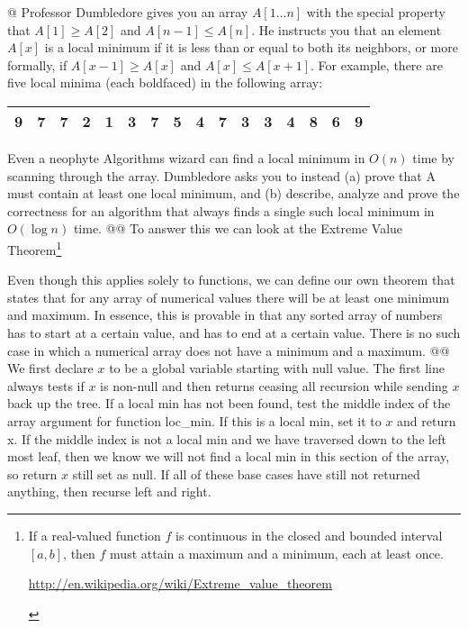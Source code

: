 \documentclass[10pt]{article}
\begin{document}
\begin{easylist}[enumerate]
    @ Professor Dumbledore gives you an array $A[1\ldots n]$ with the special property that $A[1] \ge A[2]$ and $A[n - 1]
    \le A[n]$. He instructs you that an element $A[x]$ is a local minimum if it is less than or equal to both its
    neighbors, or more formally, if $A[x − 1] \ge A[x]$ and $A[x] \le A[x + 1]$. For example, there are five local
    minima (each boldfaced) in the following array:

    \begin{table}[!ht]
        \centering
        \begin{tabular}{|l|l|l|l|l|l|l|l|l|l|l|l|l|l|l|l|}
            \hline
            9 & 7 & 7 & 2 & \textbf{1} & 3 & 7 & 5 & \textbf{4} & 7 & \textbf{3} & \textbf{3} & 4 & 8 & \textbf{6} & 9\\
            \hline
        \end{tabular}
    \end{table}

    Even a neophyte Algorithms wizard can find a local minimum in $O(n)$ time by scanning through the array. Dumbledore
    asks you to instead (a) prove that A must contain at least one local minimum, and (b) describe, analyze and prove
    the correctness for an algorithm that always finds a single such local minimum in $O(\log n)$ time.
    @@ To answer this we can look at the Extreme Value Theorem\footnote{\begin{thm}
        If a real-valued function $f$ is continuous in the closed and bounded interval $[a,b]$, then $f$ must attain a
        maximum and a minimum, each at least once.

        \url{http://en.wikipedia.org/wiki/Extreme_value_theorem}
    \end{thm}}\newline

    Even though this applies solely to functions, we can define our own theorem that states that for any array of
    numerical values there will be at least one minimum and maximum. In essence, this is provable in that any sorted
    array of numbers has to start at a certain value, and has to end at a certain value. There is no such case in which
    a numerical array does not have a minimum and a maximum.
    @@ We first declare $x$ to be a global variable starting with null value. The first line always tests if $x$ is
    non-null and then returns ceasing all recursion while sending $x$ back up the tree. If a local min has not been
    found, test the middle index of the array argument for function loc\_min.  If this is a local min, set it to $x$ and
    return x.  If the middle index is not a local min and we have traversed down to the left most leaf, then we know we
    will not find a local min in this section of the array, so return $x$ still set as null.  If all of these base cases
    have still not returned anything, then recurse left and right.


\end{easylist}
\end{document}

